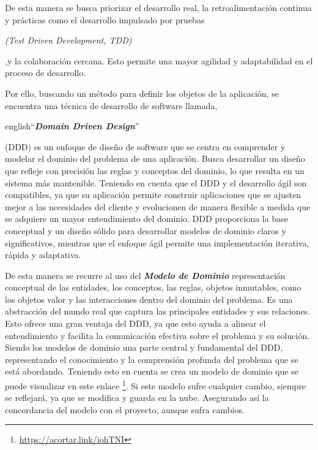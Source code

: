 De esta manera se busca priorizar el desarrollo real, la retroalimentación continua y prácticas como 
el desarrollo impulsado por pruebas \begin{otherlanguage}{english}\textit{(Test Driven Development, TDD)}\end{otherlanguage}  
,y la colaboración cercana. Esto permite una mayor agilidad y adaptabilidad en el proceso de desarrollo.

Por ello, buscando un método para definir los objetos de la aplicación, se encuentra una técnica de 
desarrollo de software llamada, \begin{otherlanguage}
{english}``\textit{\textbf{Domain Driven Design}}''\end{otherlanguage}(DDD) es un enfoque de diseño de 
software que se centra en comprender y modelar el dominio del problema de una aplicación. Busca 
desarrollar un diseño que refleje con precisión las reglas y conceptos del dominio, lo que resulta en 
un sistema más mantenible. Teniendo en cuenta que el DDD y el desarrollo ágil son compatibles, ya que 
su aplicación permite construir aplicaciones que se ajusten mejor a las necesidades del cliente y 
evolucionen de manera flexible a medida que se adquiere un mayor entendimiento del dominio. DDD 
proporciona la base conceptual y un diseño sólido para desarrollar modelos de dominio claros y 
significativos, mientras que el enfoque ágil permite una implementación iterativa, rápida y adaptativa.

De esta manera se recurre al uso del \textit{\textbf{Modelo de Dominio}} representación conceptual de 
las entidades, los conceptos, las reglas, objetos inmutables, como los objetos valor y las 
interacciones dentro del dominio del problema. Es una abstracción del mundo real que captura las 
principales entidades y sus relaciones. Esto ofrece una gran ventaja del DDD, ya que esto ayuda a 
alinear el entendimiento y facilita la comunicación efectiva sobre el problema y su solución. Siendo 
los modelos de dominio una parte central y fundamental del DDD, representando el conocimiento y la 
comprensión profunda del problema que se está abordando. Teniendo esto en cuenta se crea un modelo de 
dominio que se puede visualizar en este enlace \footnote{\url{https://acortar.link/iohTNI}}. Si este 
modelo sufre cualquier cambio, siempre se reflejará, ya que se modifica y guarda en la nube. Asegurando 
así la concordancia del modelo con el proyecto, aunque sufra cambios.

